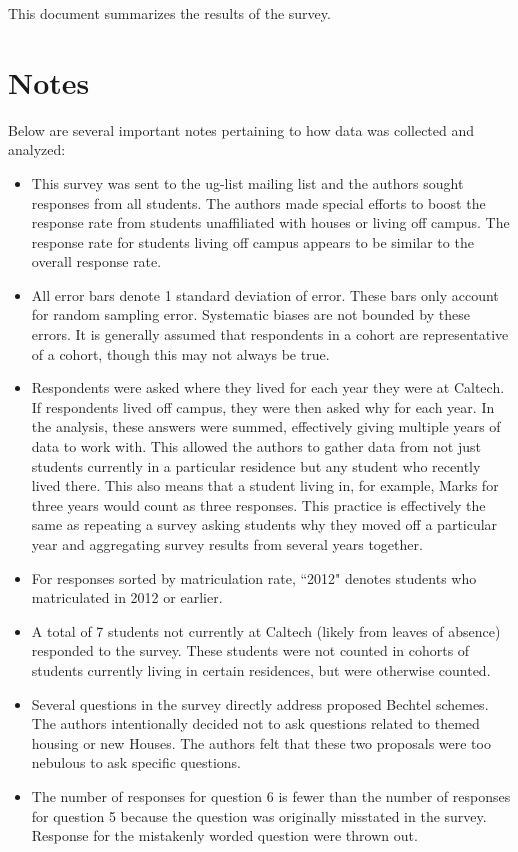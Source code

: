 \documentclass[12pt]{article} %
\begin{document}
This document summarizes the results of the survey.
\newpage
\section{Notes}
Below are several important notes pertaining to how data was collected and analyzed:

\begin{itemize}
\item This survey was sent to the ug-list mailing list and the authors sought responses from all students. The authors made special efforts to boost the response rate from students unaffiliated with houses or living off campus. The response rate for students living off campus appears to be similar to the overall response rate.
\item All error bars denote 1 standard deviation of error. These bars only account for random sampling error. Systematic biases are not bounded by these errors. It is generally assumed that respondents in a cohort are representative of a cohort, though this may not always be true.
\item Respondents were asked where they lived for each year they were at Caltech. If respondents lived off campus, they were then asked why for each year. In the analysis, these answers were summed, effectively giving multiple years of data to work with. This allowed the authors to gather data from not just students currently in a particular residence but any student who recently lived there. This also means that a student living in, for example, Marks for three years would count as three responses. This practice is effectively the same as repeating a survey asking students why they moved off a particular year and aggregating survey results from several years together.
\item For responses sorted by matriculation rate, ``2012" denotes students who matriculated in 2012 or earlier. 
\item A total of 7 students not currently at Caltech (likely from leaves of absence) responded to the survey. These students were not counted in cohorts of students currently living in certain residences, but were otherwise counted. 
\item Several questions in the survey directly address proposed Bechtel schemes. The authors intentionally decided not to ask questions related to themed housing or new Houses. The authors felt that these two proposals were too nebulous to ask specific questions.
\item The number of responses for question 6 is fewer than the number of responses for question 5 because the question was originally misstated in the survey. Response for the mistakenly worded question were thrown out.

\end{itemize}
\end{document}
